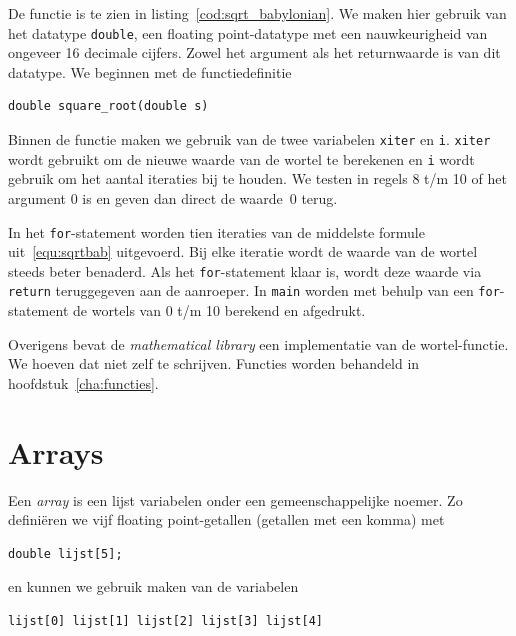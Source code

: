 De functie is te zien in listing~\ref{cod:sqrt_babylonian}. We maken hier gebruik van het datatype \texttt{double}, een floating point-datatype met een nauwkeurigheid van ongeveer 16 decimale cijfers. Zowel het argument als het returnwaarde is van dit datatype. We beginnen met de functiedefinitie

\begin{lstlisting}[style=lstoneline]
double square_root(double s)
\end{lstlisting}

Binnen de functie maken we gebruik van de twee variabelen \texttt{xiter} en \texttt{i}. \texttt{xiter} wordt gebruikt om de nieuwe waarde van de wortel te berekenen en \texttt{i} wordt gebruik om het aantal iteraties bij te houden.
We testen in regels 8 t/m 10 of het argument 0 is en geven dan direct de waarde~0 terug.


In het \texttt{for}-statement worden tien iteraties van de middelste formule uit~\eqref{equ:sqrtbab} uitgevoerd. Bij elke iteratie wordt de waarde van de wortel steeds beter benaderd. Als het \texttt{for}-statement klaar is, wordt deze waarde via \texttt{return} teruggegeven aan de aanroeper. In \texttt{main} worden met behulp van een \texttt{for}-statement de wortels van 0 t/m 10 berekend en afgedrukt.

Overigens bevat de \textsl{mathematical library} een implementatie van de wortel-functie. We hoeven dat niet zelf te schrijven. Functies worden behandeld in hoofdstuk~\ref{cha:functies}.


\section{Arrays}
Een \textsl{array} is een lijst variabelen onder een gemeenschappelijke noemer. Zo definiëren we vijf floating point-getallen (getallen met een komma) met

\begin{lstlisting}[style=lstoneline]
double lijst[5];
\end{lstlisting}

en kunnen we gebruik maken van de variabelen

\begin{lstlisting}[style=lstoneline]
lijst[0] lijst[1] lijst[2] lijst[3] lijst[4]
\end{lstlisting}

